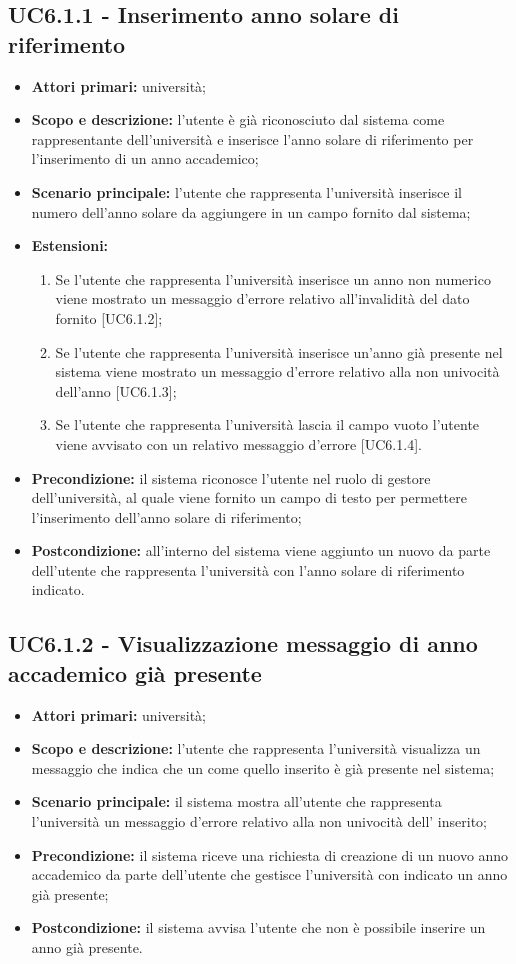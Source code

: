 \documentclass[AnalisiDeiRequisiti.tex]{subfiles}
\begin{document}
\subsection{UC6.1.1 - Inserimento anno solare di riferimento}
	\begin{itemize}
	\item \textbf{Attori primari:} università;
	\item \textbf{Scopo e descrizione:} l'utente è già riconosciuto dal sistema come rappresentante dell'università e inserisce l'anno solare di riferimento per l'inserimento di un anno accademico;
	\item \textbf{Scenario principale:} l'utente che rappresenta l'università inserisce il numero dell'anno solare da aggiungere in un campo fornito dal sistema;
	\item \textbf{Estensioni:}
	\begin{enumerate}
		\item Se l'utente che rappresenta l'università inserisce un anno non numerico viene mostrato un messaggio d'errore relativo all'invalidità del dato fornito [UC6.1.2];
		\item Se l'utente che rappresenta l'università inserisce un'anno già presente nel sistema viene mostrato un messaggio d'errore relativo alla non univocità dell'anno [UC6.1.3];
		\item Se l'utente che rappresenta l'università lascia il campo vuoto l'utente viene avvisato con un relativo messaggio d'errore [UC6.1.4].
	\end{enumerate}
	\item \textbf{Precondizione:} il sistema riconosce l'utente nel ruolo di gestore dell'università, al quale viene fornito un campo di testo per permettere l'inserimento dell'anno solare di riferimento; 
	\item \textbf{Postcondizione:} all'interno del sistema viene aggiunto un nuovo  da parte dell'utente che rappresenta l'università con l'anno solare di riferimento indicato.
\end{itemize}
\subsection{UC6.1.2 - Visualizzazione messaggio di anno accademico già presente}
\begin{itemize}
	\item \textbf{Attori primari:} università;
	\item \textbf{Scopo e descrizione:} l'utente che rappresenta l'università visualizza un messaggio che indica che un  come quello inserito è già presente nel sistema;
	\item \textbf{Scenario principale:} il sistema mostra all'utente che rappresenta l'università un messaggio d'errore relativo alla non univocità dell' inserito;
	\item \textbf{Precondizione:} il sistema riceve una richiesta di creazione di un nuovo anno accademico da parte dell'utente che gestisce l'università con indicato un anno già presente;
	\item \textbf{Postcondizione:} il sistema avvisa l'utente che non è possibile inserire un anno già presente.
\end{itemize}
\end{document}
